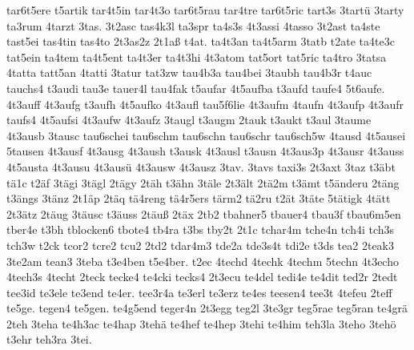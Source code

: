 {    tar6t5ere
    t5artik
    tar4t5in
    tar4t3o
    tar6t5rau
    tar4tre
    tar6t5ric
    tart3s
    3tartü
    3tarty
    ta3rum
    4tarzt
    3tas.
    3t2asc
    tas4k3l
    ta3spr
    ta4s3s
    4t3assi
    4tasso
    3t2ast
    ta4ste
    tast5ei
    tas4tin
    tas4to
    2t3as2z
    2t1aß
    t4at.
    ta4t3an
    ta4t5arm
    3tatb
    t2ate
    ta4te3c
    tat5ein
    ta4tem
    ta4t5ent
    ta4t3er
    ta4t3hi
    4t3atom
    tat5ort
    tat5ric
    ta4tro
    3tatsa
    4tatta
    tatt5an
    4tatti
    3tatur
    tat3zw
    tau4b3a
    tau4bei
    3taubh
    tau4b3r
    t4auc
    tauchs4
    t3audi
    tau3e
    tauer4l
    tau4fak
    t5aufar
    4t5aufba
    t3aufd
    taufe4
    5t6aufe.
    4t3auff
    4t3aufg
    t3aufh
    4t5aufko
    4t3aufl
    tau5f6lie
    4t3aufm
    4taufn
    4t3aufp
    4t3aufr
    taufs4
    4t5aufsi
    4t3aufw
    4t3aufz
    3taugl
    t3augm
    2tauk
    t3aukt
    t3aul
    3taume
    4t3ausb
    3tausc
    tau6schei
    tau6schm
    tau6schn
    tau6schr
    tau6sch5w
    4tausd
    4t5ausei
    5tausen
    4t3ausf
    4t3ausg
    4t3aush
    t3ausk
    4t3ausl
    t3ausn
    4t3aus3p
    4t3ausr
    4t3auss
    4t5austa
    4t3ausu
    4t3ausü
    4t3ausw
    4t3ausz
    3tav.
    3tavs
    taxi3s
    2t3axt
    3taz
    t3äbt
    tä1c
    t2äf
    3tägi
    3tägl
    2tägy
    2täh
    t3ähn
    3täle
    2t3ält
    2tä2m
    t3ämt
    t5änderu
    2täng
    t3ängs
    3tänz
    2t1äp
    2täq
    tä4reng
    tä4r5ers
    tärm2
    tä2ru
    t2ät
    3täte
    5tätigk
    4tätt
    2t3ätz
    2täug
    3täusc
    t3äuss
    2täuß
    2täx
    2tb2
    tbahner5
    tbauer4
    tbau3f
    tbau6m5en
    tber4e
    t3bh
    tblocken6
    tbote4
    tb4ra
    t3bs
    tby2t
    2t1c
    tchar4m
    tche4n
    tch4i
    tch3s
    tch3w
    t2ck
    tcor2
    tcre2
    tcu2
    2td2
    tdar4m3
    tde2a
    tde3s4t
    tdi2e
    t3ds
    tea2
    2teak3
    3te2am
    tean3
    3teba
    t3e4ben
    t5e4ber.
    t2ec
    4techd
    4techk
    4techm
    5techn
    4t3echo
    4tech3s
    4techt
    2teck
    tecke4
    te4cki
    tecks4
    2t3ecu
    te4del
    tedi4e
    te4dit
    ted2r
    2tedt
    tee3id
    te3ele
    te3end
    te4er.
    tee3r4a
    te3erl
    te3erz
    te4es
    teesen4
    tee3t
    4tefeu
    2teff
    te5ge.
    tegen4
    te5gen.
    te4g5end
    teger4n
    2t3egg
    teg2l
    3te3gr
    teg5rae
    teg5ran
    te4grä
    2teh
    3teha
    te4h3ac
    te4hap
    3tehä
    te4hef
    te4hep
    3tehi
    te4him
    teh3la
    3teho
    3tehö
    t3ehr
    teh3ra
    3tei.
}

